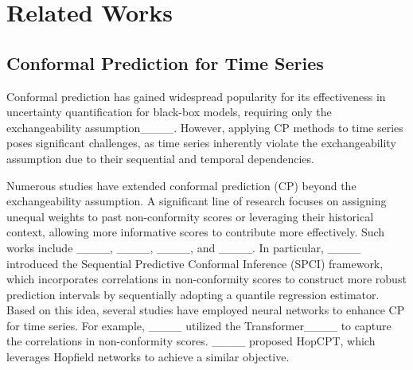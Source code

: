 \section{Related Works}
\label{sec:related_works}

\subsection{Conformal Prediction for Time Series}

Conformal prediction has gained widespread popularity for its effectiveness in uncertainty quantification for black-box models, requiring only the exchangeability assumption____. However, applying CP methods to time series poses significant challenges, as time series inherently violate the exchangeability assumption due to their sequential and temporal dependencies. 

Numerous studies have extended conformal prediction (CP) beyond the exchangeability assumption. A significant line of research focuses on assigning unequal weights to past non-conformity scores or leveraging their historical context, allowing more informative scores to contribute more effectively. Such works include ____, ____, ____, and ____. In particular, ____ introduced the Sequential Predictive Conformal Inference (SPCI) framework, which incorporates correlations in non-conformity scores to construct more robust prediction intervals by sequentially adopting a quantile regression estimator. Based on this idea, several studies have employed neural networks to enhance CP for time series. For example, ____ utilized the Transformer____ to capture the correlations in non-conformity scores. ____ proposed HopCPT, which leverages Hopfield networks to achieve a similar objective.


